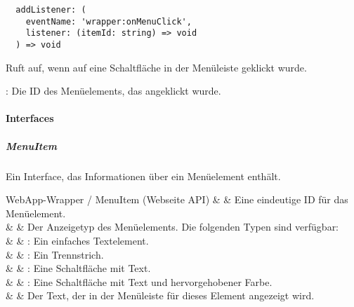 \begin{verbatim}
  addListener: (
    eventName: 'wrapper:onMenuClick',
    listener: (itemId: string) => void
  ) => void
\end{verbatim}

Ruft  auf, wenn auf eine Schaltfläche in der Menüleiste geklickt wurde.

\begin{arguments}
  \item {}: Die ID des Menüelements, das angeklickt wurde.
\end{arguments}


\newpage

\paragraph{Interfaces}


\subparagraph{MenuItem}

Ein Interface, das Informationen über ein Menüelement enthält.

\begin{interfacedesc}{WebApp-Wrapper / MenuItem (Webseite API)}
     &  & Eine eindeutige ID für das Menüelement. \\ \hline
   &  & Der Anzeigetyp des Menüelements. Die folgenden Typen sind verfügbar: \\
              &                           & \textbf{}: Ein einfaches Textelement. \\
              &                           & \textbf{}: Ein Trennstrich. \\
              &                           & \textbf{}: Eine Schaltfläche mit Text. \\
              &                           & \textbf{}: Eine Schaltfläche mit Text und hervorgehobener Farbe. \\ \hline
   &  & Der Text, der in der Menüleiste für dieses Element angezeigt wird. \\ \hline
\end{interfacedesc}
